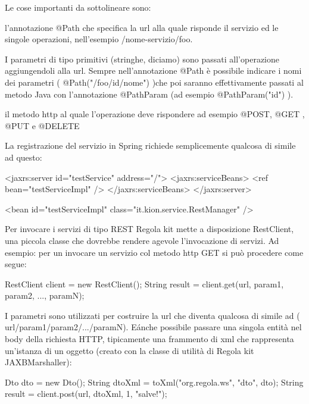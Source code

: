 Le cose importanti da sottolineare sono:
\begin{enumerate*}
\item l'annotazione @Path che specifica la url alla quale risponde il servizio ed le singole operazioni, nell'esempio /nome-servizio/foo. 
\item I parametri di tipo primitivi (stringhe, diciamo) sono passati all'operazione aggiungendoli alla url. Sempre nell'annotazione @Path è possibile indicare i nomi dei parametri ( @Path("/foo/{id}/{nome}") )che poi saranno effettivamente passati al metodo Java con l'annotazione @PathParam (ad esempio @PathParam("id") ).
\item il metodo http al quale l'operazione deve rispondere ad esempio @POST, @GET , @PUT e @DELETE
\end{enumerate*}

La registrazione del servizio in Spring richiede semplicemente qualcosa di simile ad questo:

\begin{xml}
  <jaxrs:server id="testService" address="/">
    <jaxrs:serviceBeans>
        <ref bean="testServiceImpl" />
      </jaxrs:serviceBeans>
  </jaxrs:server>

  <bean id="testServiceImpl" class="it.kion.service.RestManager" />
\end{xml}

Per invocare i servizi di tipo REST Regola kit mette a disposizione RestClient,  una piccola classe che dovrebbe rendere agevole l'invocazione di servizi. Ad esempio:
 per un invocare un servizio col metodo http GET si può procedere come segue:

\begin{java}
 RestClient client = new RestClient(); 
 String result = client.get(url, param1, param2, ..., paramN);
 
\end{java}

I parametri sono utilizzati per costruire la url che diventa qualcosa di simile ad ( url/param1/param2/.../paramN).
 E\' anche possibile passare una singola entità nel body della richiesta HTTP, tipicamente una frammento di xml che rappresenta un'istanza di un oggetto (creato con la classe di utilità di Regola kit  JAXBMarshaller):

\begin{java}
 Dto dto = new Dto();
 String dtoXml = toXml("org.regola.ws", "dto", dto);
 String result = client.post(url, dtoXml, 1, "salve!");
 
\end{java}
 
